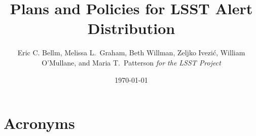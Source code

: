 \documentclass[DM,toc,lsstdraft]{lsstdoc}
\title{Plans and Policies for LSST Alert Distribution}
\author{
     Eric C. Bellm, Melissa L.~Graham, Beth Willman, Zeljko Ivezi\'{c}, William O'Mullane, and Maria T.~Patterson
     \emph{for the LSST Project}
}
\date{\today}
\begin{document}
\maketitle









\clearpage

\section{Acronyms}



\end{document}
